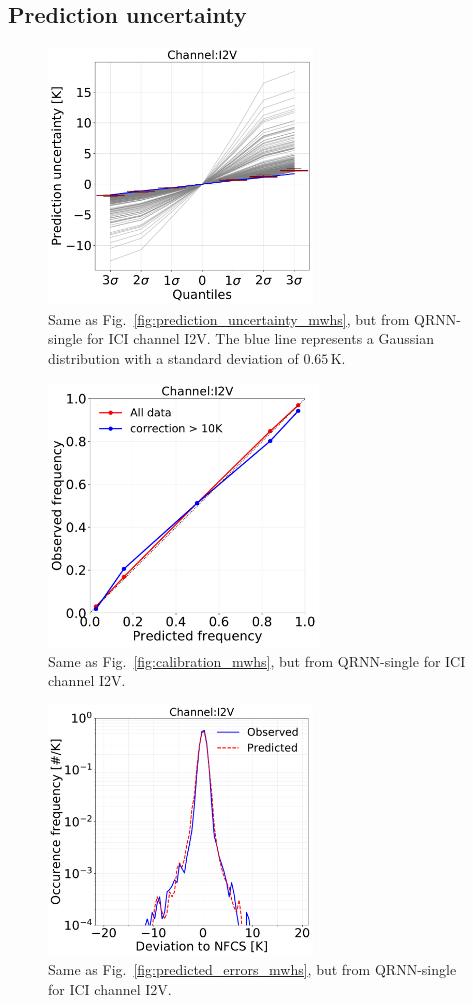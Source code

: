\documentclass[amt, manuscript]{copernicus}
\begin{document}
\subsection{Prediction uncertainty}
\label{sec:prediction_uncertainty}
\begin{figure}[t]
	\includegraphics[width = 70mm]{Figures/prediction_uncertainty_I2V.pdf}	
	\caption{Same as Fig.~\ref{fig:prediction_uncertainty_mwhs}, but from QRNN-single for ICI channel I2V. The blue line represents a Gaussian distribution with a standard deviation of $0.65$\,K.}
	\label{fig:prediction_uncertainty_I2V}	
\end{figure}
\begin{figure}[t]
	\includegraphics[height = 70mm]{Figures/calibration_QRNN_I2V.pdf}	
	\caption{Same as Fig.~\ref{fig:calibration_mwhs}, but from QRNN-single for ICI channel I2V. }
	\label{fig:calibration_I2V}	
\end{figure}
\begin{figure}[t]
	\includegraphics[width=70mm]{Figures/deviation_posterior_samples_I2V.pdf}	
	\caption{Same as Fig.~\ref{fig:predicted_errors_mwhs}, but from QRNN-single for ICI channel I2V.}
	\label{fig:predicted_errors}	
\end{figure}
\end{document}
